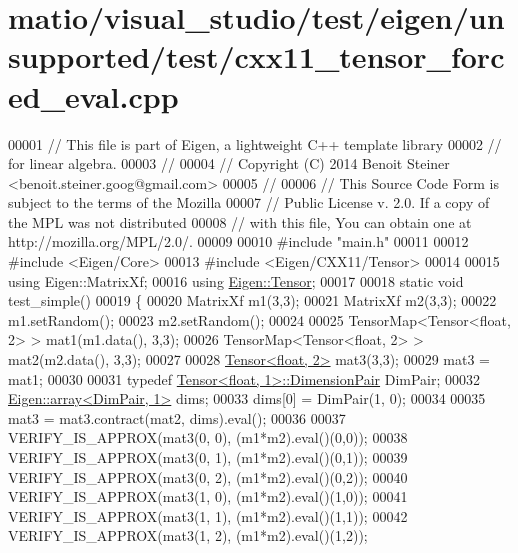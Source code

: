 \hypertarget{matio_2visual__studio_2test_2eigen_2unsupported_2test_2cxx11__tensor__forced__eval_8cpp_source}{}\section{matio/visual\+\_\+studio/test/eigen/unsupported/test/cxx11\+\_\+tensor\+\_\+forced\+\_\+eval.cpp}
\label{matio_2visual__studio_2test_2eigen_2unsupported_2test_2cxx11__tensor__forced__eval_8cpp_source}

\begin{DoxyCode}
00001 \textcolor{comment}{// This file is part of Eigen, a lightweight C++ template library}
00002 \textcolor{comment}{// for linear algebra.}
00003 \textcolor{comment}{//}
00004 \textcolor{comment}{// Copyright (C) 2014 Benoit Steiner <benoit.steiner.goog@gmail.com>}
00005 \textcolor{comment}{//}
00006 \textcolor{comment}{// This Source Code Form is subject to the terms of the Mozilla}
00007 \textcolor{comment}{// Public License v. 2.0. If a copy of the MPL was not distributed}
00008 \textcolor{comment}{// with this file, You can obtain one at http://mozilla.org/MPL/2.0/.}
00009 
00010 \textcolor{preprocessor}{#include "main.h"}
00011 
00012 \textcolor{preprocessor}{#include <Eigen/Core>}
00013 \textcolor{preprocessor}{#include <Eigen/CXX11/Tensor>}
00014 
00015 \textcolor{keyword}{using} Eigen::MatrixXf;
00016 \textcolor{keyword}{using} \hyperlink{class_eigen_1_1_tensor}{Eigen::Tensor};
00017 
00018 \textcolor{keyword}{static} \textcolor{keywordtype}{void} test\_simple()
00019 \{
00020   MatrixXf m1(3,3);
00021   MatrixXf m2(3,3);
00022   m1.setRandom();
00023   m2.setRandom();
00024 
00025   TensorMap<Tensor<float, 2> > mat1(m1.data(), 3,3);
00026   TensorMap<Tensor<float, 2> > mat2(m2.data(), 3,3);
00027 
00028   \hyperlink{class_eigen_1_1_tensor}{Tensor<float, 2>} mat3(3,3);
00029   mat3 = mat1;
00030 
00031   \textcolor{keyword}{typedef} \hyperlink{class_eigen_1_1_tensor}{Tensor<float, 1>::DimensionPair} DimPair;
00032   \hyperlink{class_eigen_1_1array}{Eigen::array<DimPair, 1>} dims;
00033   dims[0] = DimPair(1, 0);
00034 
00035   mat3 = mat3.contract(mat2, dims).eval();
00036 
00037   VERIFY\_IS\_APPROX(mat3(0, 0), (m1*m2).eval()(0,0));
00038   VERIFY\_IS\_APPROX(mat3(0, 1), (m1*m2).eval()(0,1));
00039   VERIFY\_IS\_APPROX(mat3(0, 2), (m1*m2).eval()(0,2));
00040   VERIFY\_IS\_APPROX(mat3(1, 0), (m1*m2).eval()(1,0));
00041   VERIFY\_IS\_APPROX(mat3(1, 1), (m1*m2).eval()(1,1));
00042   VERIFY\_IS\_APPROX(mat3(1, 2), (m1*m2).eval()(1,2));

\end{DoxyCode}
